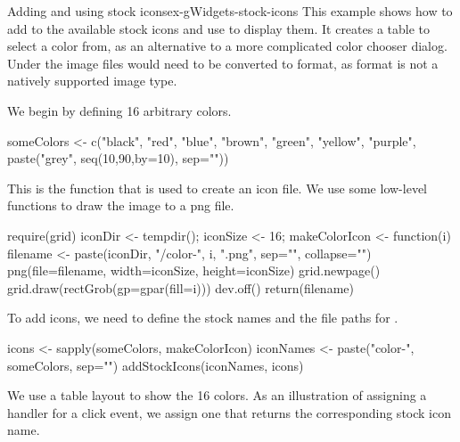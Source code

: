 \begin{example}{Adding and using stock icons}{ex-gWidgets-stock-icons}
This example shows how to add to the available stock icons and use
 to display them. It creates a table to select a color
from, as an alternative to a more complicated color chooser
dialog. Under  the image files would need to be
converted to  format, as  format is not a natively
supported image type.

We begin by defining 16 arbitrary colors.

\begin{Schunk}
\begin{Sinput}
 someColors <- c("black", "red", "blue", "brown",
                 "green", "yellow", "purple",
                 paste("grey", seq(10,90,by=10), sep=""))
\end{Sinput}
\end{Schunk}

This is the function that is used to create an icon file. We use some
low-level  functions to draw the image to a png file.
\begin{Schunk}
\begin{Sinput}
 require(grid)
 iconDir <- tempdir(); iconSize <- 16;
 makeColorIcon <- function(i) {
   filename <- paste(iconDir, "/color-", i, ".png",
                     sep="", collapse="")
   png(file=filename, width=iconSize, height=iconSize)
   grid.newpage()
   grid.draw(rectGrob(gp=gpar(fill=i)))
   dev.off()
   return(filename)
 }
\end{Sinput}
\end{Schunk}

To add icons, we need to define the stock names and the file paths for
.

\begin{Schunk}
\begin{Sinput}
 icons <- sapply(someColors, makeColorIcon)
 iconNames <- paste("color-", someColors, sep="")
 addStockIcons(iconNames, icons)
\end{Sinput}
\end{Schunk}

We use a table layout to show the 16 colors. As an illustration of
assigning a handler for a click event, we assign one that returns the
corresponding stock icon name.

\begin{Schunk}
\end{Schunk}
\end{example}

